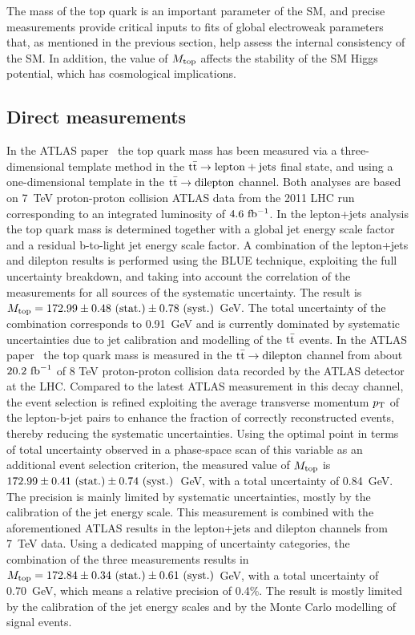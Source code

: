 \documentclass{blois}
\begin{document}
The mass of the top quark is an important parameter of the SM, and precise
measurements provide critical inputs to fits of global electroweak parameters
that, as mentioned in the previous section, help assess the internal consistency
of the SM. In addition, the value of $M_{\rm top}$ affects the stability of the
SM Higgs potential, which has cosmological implications.


\subsection{Direct measurements}

In the ATLAS paper~\cite{ref:ATLAS-topMass7TeV} the top quark mass has been
measured via a three-dimensional template method in the ${\rm t{\bar t}\to \rm lepton+jets}$
final state, and using a one-dimensional template in the ${\rm t{\bar t}\to dilepton}$
channel. Both analyses are based on 7~TeV proton-proton collision ATLAS data from
the 2011 LHC run corresponding to an integrated luminosity of $4.6~{\rm fb^{-1}}$.
In the lepton+jets analysis the top quark mass is determined together with a global
jet energy scale factor and a residual b-to-light jet energy scale factor. A
combination of the lepton+jets and dilepton results is performed using the BLUE
technique, exploiting the full uncertainty breakdown, and taking into account the
correlation of the measurements for all sources of the systematic uncertainty.
The result is $M_{\rm top} = 172.99 \pm 0.48~({\rm stat.}) \pm 0.78~({\rm syst.})$~GeV.
The total uncertainty of the combination corresponds to 0.91~GeV and is currently
dominated by systematic uncertainties due to jet calibration and modelling of the
${\rm t{\bar t}}$ events. In the ATLAS paper~\cite{ref:ATLAS-topMassDilepton8TeV}
the top quark mass is measured in the ${\rm t{\bar t}\to dilepton}$ channel from
about $20.2~{\rm fb}^{-1}$ of 8 TeV proton-proton collision data recorded by the
ATLAS detector at the LHC. Compared to the latest ATLAS measurement in this decay
channel, the event selection is refined exploiting the average transverse
momentum $p_{\rm T}$ of the lepton-b-jet pairs to enhance the fraction of
correctly reconstructed events, thereby reducing the systematic uncertainties.
Using the optimal point in terms of total uncertainty observed in a phase-space
scan of this variable as an additional event selection criterion, the measured
value of $M_{\rm top}$ is $172.99\pm 0.41~({\rm stat.})\pm 0.74~({\rm syst.})$~GeV,
with a total uncertainty of 0.84~GeV. The precision is mainly limited by systematic
uncertainties, mostly by the calibration of the jet energy scale. This measurement
is combined with the aforementioned ATLAS results in the lepton+jets and dilepton
channels from 7~TeV data. Using a dedicated mapping of uncertainty categories, the
combination of the three measurements results in
$M_{\rm top} = 172.84 \pm 0.34~({\rm stat.}) \pm 0.61~({\rm syst.})$~GeV, with a
total uncertainty of 0.70~GeV, which means a relative precision of 0.4\%. The
result is mostly limited by the calibration of the jet energy scales and by the
Monte Carlo modelling of signal events.
\end{document}
